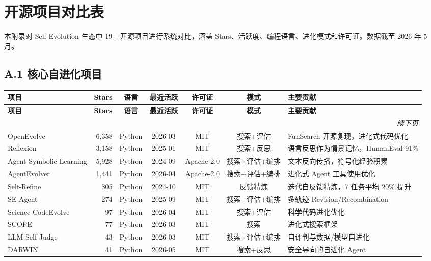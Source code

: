 
\appendix

\section{开源项目对比表}\label{app:projects}

本附录对 Self-Evolution 生态中 19+ 开源项目进行系统对比，涵盖 Stars、活跃度、编程语言、进化模式和许可证。数据截至 2026 年 5 月。

\subsection*{A.1 核心自进化项目}

\begin{longtable}{p{2.8cm}rccccp{2.5cm}}
\toprule
\textbf{项目} & \textbf{Stars} & \textbf{语言} & \textbf{最近活跃} & \textbf{许可证} & \textbf{模式} & \textbf{主要贡献} \\
\midrule
\endfirsthead
\toprule
\textbf{项目} & \textbf{Stars} & \textbf{语言} & \textbf{最近活跃} & \textbf{许可证} & \textbf{模式} & \textbf{主要贡献} \\
\midrule
\endhead
\midrule
\multicolumn{7}{r}{\textit{续下页}} \\
\endfoot
\bottomrule
\endlastfoot

OpenEvolve & 6,358 & Python & 2026-03 & MIT & 搜索+评估 & FunSearch 开源复现，进化式代码优化 \\
Reflexion & 3,158 & Python & 2025-01 & MIT & 搜索+反思 & 语言反思作为情景记忆，HumanEval 91\% \\
Agent Symbolic Learning & 5,928 & Python & 2024-09 & Apache-2.0 & 搜索+评估+编排 & 文本反向传播，符号化经验积累 \\
AgentEvolver & 1,441 & Python & 2026-04 & Apache-2.0 & 搜索+评估+编排 & 进化式 Agent 工具使用优化 \\
Self-Refine & 805 & Python & 2024-10 & MIT & 反馈精炼 & 迭代自反馈精炼，7 任务平均 20\% 提升 \\
SE-Agent & 274 & Python & 2025-09 & MIT & 搜索+评估+编排 & 多轨迹 Revision/Recombination \\
Science-CodeEvolve & 97 & Python & 2026-04 & MIT & 搜索+评估 & 科学代码进化优化 \\
SCOPE & 77 & Python & 2026-03 & MIT & 搜索 & 进化式搜索框架 \\
LLM-Self-Judge & 43 & Python & 2026-03 & MIT & 搜索+评估+编排 & 自评判与数据/模型自进化 \\
DARWIN & 41 & Python & 2026-05 & MIT & 搜索+反思 & 安全导向的自进化 Agent \\
\end{longtable}

